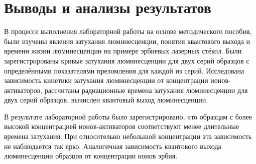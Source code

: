 \section{Выводы и анализы результатов}\label{sec:conclution}
В процессе выполнения лабораторной работы на основе методического пособия\cite{AseevMetoda}, были изучены явления затухания люминесценции,
понятия квантового выхода и времени жизни люминесценции на примере эрбиевых лазерных стёкол.
Были зарегистрированы кривые затухания люминесценции для двух серий образцов с определёнными показателями преломления для каждой из серий.
Исследована зависимость кинетики затухания люминесценции от концентрации ионов-активаторов,
рассчитаны радиационные времена затухания люминесценции для двух серий образцов, вычислен квантовый выход люминесценции.

В результате лабораторной работы было зарегистрировано,
что образцам с более высокой концентрацией ионов-активаторов соответствуют менее длительные времена затухания.
При относительно небольшой концентрации эта зависимость не наблюдается так ярко.
Аналогичная зависимость квантового выхода люминесценции образцов от концентрации ионов эрбия.

